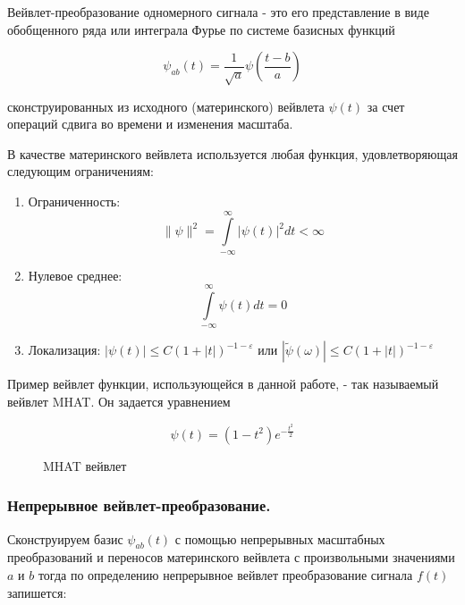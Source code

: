 \documentclass[a4paper,12pt]{extarticle}
\begin{document}
Вейвлет-преобразование одномерного сигнала - это его представление в виде обобщенного ряда или интеграла Фурье по системе базисных функций

$$ \psi_{ab}(t) =\frac{1}{\sqrt{a}} \psi(\frac{t-b}{a}) $$

сконструированных из исходного (материнского) вейвлета $\psi(t)$ за счет операций сдвига во времени и изменения масштаба.

В качестве материнского вейвлета используется любая функция, удовлетворяющая следующим ограничениям:
\begin{enumerate}
    \item Ограниченность:
        $$ \|\psi\|^2 = \int\limits_{-\infty}^{\infty} |\psi(t)|^2 dt < \infty $$
    \item Нулевое среднее:
        $$ \int\limits_{-\infty}^{\infty} \psi(t) dt = 0 $$
    \item Локализация:
        $ |\psi(t)| \leq C(1+|t|)^{-1-\varepsilon} $ или $ |\widetilde{\psi}(\omega)| \leq C(1+|t|)^{-1-\varepsilon} $
\end{enumerate}

Пример вейвлет функции, использующейся в данной работе, - так называемый вейвлет MHAT. Он задается уравнением

$$ \psi(t) = (1-t^2) e^{-\frac{t^2}{2}} $$

\begin{figure}[H]
  \noindent{}
  \caption{MHAT вейвлет}
  \label{fig:MHATWavelet}
\end{figure}

\subsubsection{Непрерывное вейвлет-преобразование.}

Сконструируем базис $\psi_{ab}(t)$ с помощью непрерывных масштабных преобразований и переносов материнского вейвлета с произвольными значениями $a$ и $b$ тогда по определению непрерывное вейвлет преобразование сигнала $f(t)$ запишется:
\end{document}
